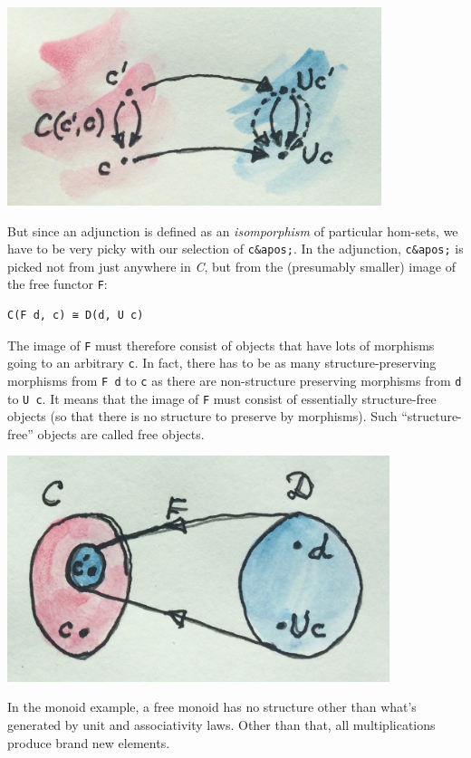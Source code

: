 \includegraphics[width=4.30208in]{images/forgettingmorphisms.jpg}

But since an adjunction is defined as an \emph{isomporphism} of
particular hom-sets, we have to be very picky with our selection of
\texttt{c\&apos;}. In the adjunction, \texttt{c\&apos;} is picked not
from just anywhere in \emph{C}, but from the (presumably smaller) image
of the free functor \texttt{F}:

\begin{verbatim}
C(F d, c) ≅ D(d, U c)
\end{verbatim}

The image of \texttt{F} must therefore consist of objects that have lots
of morphisms going to an arbitrary \texttt{c}. In fact, there has to be
as many structure-preserving morphisms from \texttt{F\ d} to \texttt{c}
as there are non-structure preserving morphisms from \texttt{d} to
\texttt{U\ c}. It means that the image of \texttt{F} must consist of
essentially structure-free objects (so that there is no structure to
preserve by morphisms). Such ``structure-free'' objects are called free
objects.

\includegraphics[width=4.39583in]{images/freeimage.jpg}

In the monoid example, a free monoid has no structure other than what's
generated by unit and associativity laws. Other than that, all
multiplications produce brand new elements.

